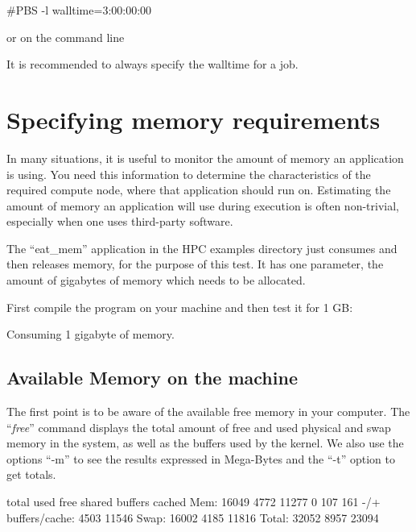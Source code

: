 \begin{prompt}
#PBS -l walltime=3:00:00:00
\end{prompt}

or on the command line

\begin{prompt}
\end{prompt}

It is recommended to always specify the walltime for a job.

\section{Specifying memory requirements}
\label{sec:specifying-memory-requirements}

In many situations, it is useful to monitor the amount of memory an application
is using. You need this information to determine the characteristics of the
required compute node, where that application should run on.  Estimating the
amount of memory an application will use during execution is often non-trivial,
especially when one uses third-party software.

\ifgent
\else
  The ``eat\_mem'' application in the HPC examples directory just consumes and then releases memory, for the
  purpose of this test. It has one parameter, the amount of gigabytes of memory
  which needs to be allocated.

  First compile the program on your machine and then test it for 1 GB:

\begin{prompt}
Consuming 1 gigabyte of memory.
\end{prompt}
\fi


\subsection{Available Memory on the machine}

The first point is to be aware of the available free memory in your computer.
The ``\emph{free}'' command displays the total amount of free and used
physical and swap memory in the system, as well as the buffers used by the
kernel. We also use the options ``-m'' to see the results expressed in
Mega-Bytes and the ``-t'' option to get totals.

\begin{prompt}
                total   used   free  shared  buffers  cached
Mem:            16049   4772  11277       0      107     161
-/+ buffers/cache:      4503  11546
Swap:           16002   4185  11816
Total:          32052   8957  23094
\end{prompt}

